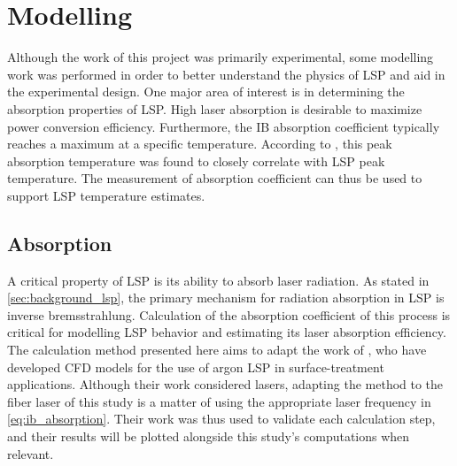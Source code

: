 \chapter{Modelling} \label{chp:models}
    Although the work of this project was primarily experimental, some modelling work was performed in order to better understand the physics of LSP and aid in the experimental design. One major area of interest is in determining the absorption properties of LSP. High laser absorption is desirable to maximize power conversion efficiency. Furthermore, the IB absorption coefficient typically reaches a maximum at a specific temperature. According to \textcite{keeferLaserSustainedPlasmas1989}, this peak absorption temperature was found to closely correlate with LSP peak temperature. The measurement of absorption coefficient can thus be used to support LSP temperature estimates.

    \section{Absorption} \label{sec:models_absorption}
        A critical property of LSP is its ability to absorb laser radiation. As stated in \autoref{sec:background_lsp}, the primary mechanism for radiation absorption in LSP is inverse bremsstrahlung. Calculation of the absorption coefficient of this process is critical for modelling LSP behavior and estimating its laser absorption efficiency. The calculation method presented here aims to adapt the work of \textcite{akarapuNumericalModelLasersustained2009,nassarInvestigationLasersustainedPlasma2012}, who have developed CFD models for the use of argon LSP in surface-treatment applications. Although their work considered  lasers, adapting the method to the fiber laser of this study is a matter of using the appropriate laser frequency in \autoref{eq:ib_absorption}. Their work was thus used to validate each calculation step, and their results will be plotted alongside this study's computations when relevant.
        
